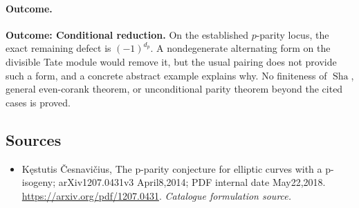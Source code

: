 \documentclass[11pt,a4paper]{article}
\numberwithin{equation}{section}
\begin{document}
\paragraph{Outcome.}
\textbf{Outcome: Conditional reduction.}
On the established $p$-parity locus, the exact remaining defect is $(-1)^{d_p}$. A nondegenerate alternating form on the divisible Tate module would remove it, but the usual pairing does not provide such a form, and a concrete abstract example explains why. No finiteness of $\operatorname{Sha}$, general even-corank theorem, or unconditional parity theorem beyond the cited cases is proved.

\subsection{Sources}
\begin{itemize}\raggedright
\item[\textnormal{[S1]}]\hypertarget{source:30006786:1}{} Kęstutis Česnavičius, The p-parity conjecture for elliptic curves with a p-isogeny; arXiv1207.0431v3 April8,2014; PDF internal date May22,2018.
\url{https://arxiv.org/pdf/1207.0431}.
{\small\textit{Catalogue formulation source.}}
\end{itemize}
\end{document}

